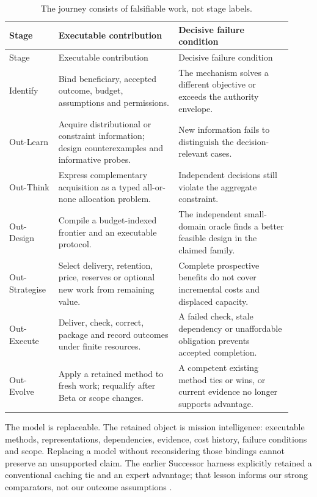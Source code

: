 \documentclass[11pt,letterpaper]{article}
\begin{document}
\begin{longtable}{p{0.16\linewidth}p{0.39\linewidth}p{0.37\linewidth}}
\caption{The journey consists of falsifiable work, not stage labels.}\label{tab:journey}\\
\toprule Stage & Executable contribution & Decisive failure condition\\\midrule\endfirsthead
\toprule Stage & Executable contribution & Decisive failure condition\\\midrule\endhead
Identify & Bind beneficiary, accepted outcome, budget, assumptions and permissions. & The mechanism solves a different objective or exceeds the authority envelope.\\
Out-Learn & Acquire distributional or constraint information; design counterexamples and informative probes. & New information fails to distinguish the decision-relevant cases.\\
Out-Think & Express complementary acquisition as a typed all-or-none allocation problem. & Independent decisions still violate the aggregate constraint.\\
Out-Design & Compile a budget-indexed frontier and an executable protocol. & The independent small-domain oracle finds a better feasible design in the claimed family.\\
Out-Strategise & Select delivery, retention, price, reserves or optional new work from remaining value. & Complete prospective benefits do not cover incremental costs and displaced capacity.\\
Out-Execute & Deliver, check, correct, package and record outcomes under finite resources. & A failed check, stale dependency or unaffordable obligation prevents accepted completion.\\
Out-Evolve & Apply a retained method to fresh work; requalify after Beta or scope changes. & A competent existing method ties or wins, or current evidence no longer supports advantage.\\\bottomrule
\end{longtable}

The model is replaceable. The retained object is mission intelligence: executable
methods, representations, dependencies, evidence, cost history, failure conditions
and scope. Replacing a model without reconsidering those bindings cannot preserve
an unsupported claim. The earlier Successor harness explicitly retained a
conventional caching tie and an expert advantage; that lesson informs our strong
comparators, not our outcome assumptions \citep{successor}.
\end{document}
